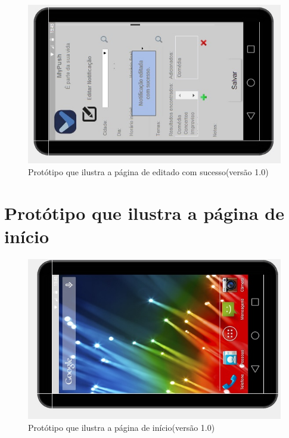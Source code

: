 \begin{apendicesenv}
    \begin{figure}[!htbp]
      \centering
      \includegraphics[scale=0.5, angle=-90]{editaveis/figuras/prototipo_alta_fidelidade_v1/1_15}
      \caption{Protótipo que ilustra a página de editado com sucesso(versão 1.0)}
      \label{v1}
    \end{figure}
    
      \section*{Protótipo que ilustra a página de início}

    \begin{figure}[!htbp]
      \centering
      \includegraphics[scale=0.5, angle=-90]{editaveis/figuras/prototipo_alta_fidelidade_v1/1_16}
      \caption{Protótipo que ilustra a página de início(versão 1.0)}
      \label{v1}
    \end{figure}




\end{apendicesenv}
